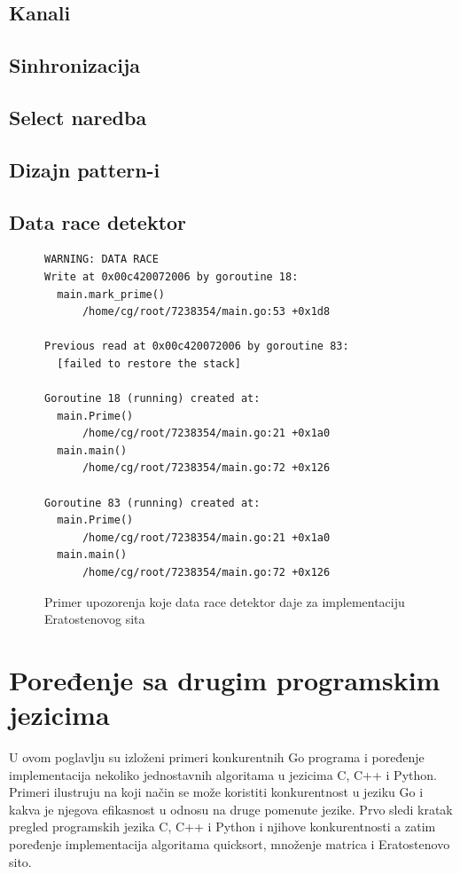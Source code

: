 \documentclass[12pt,oneside]{memoir}
\begin{document}
\section{Kanali} \label{chanel}

\section{Sinhronizacija}

\section{Select naredba}

\section{Dizajn pattern-i}

\section{Data race detektor}

\begin{figure}
\begin{center}

\begin{Verbatim}[fontsize=\small]
WARNING: DATA RACE
Write at 0x00c420072006 by goroutine 18:
  main.mark_prime()
      /home/cg/root/7238354/main.go:53 +0x1d8

Previous read at 0x00c420072006 by goroutine 83:
  [failed to restore the stack]

Goroutine 18 (running) created at:
  main.Prime()
      /home/cg/root/7238354/main.go:21 +0x1a0
  main.main()
      /home/cg/root/7238354/main.go:72 +0x126

Goroutine 83 (running) created at:
  main.Prime()
      /home/cg/root/7238354/main.go:21 +0x1a0
  main.main()
      /home/cg/root/7238354/main.go:72 +0x126
\end{Verbatim}

\caption{Primer upozorenja koje data race detektor daje za implementaciju Eratostenovog sita}
\label{fig:datarace}
\end{center}
\end{figure}



\chapter {Poređenje sa drugim programskim jezicima}
U ovom poglavlju su izloženi primeri konkurentnih Go programa i poređenje implementacija nekoliko jednostavnih algoritama u jezicima C, C++ i Python. Primeri ilustruju na koji način se može koristiti konkurentnost u jeziku Go i kakva je njegova efikasnost u odnosu na druge pomenute jezike. Prvo sledi kratak pregled programskih jezika C, C++ i Python i njihove konkurentnosti a zatim poređenje implementacija algoritama quicksort, množenje matrica i Eratostenovo sito.
\end{document}
